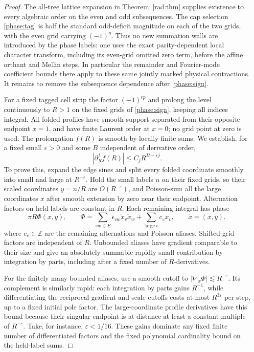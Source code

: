 \begin{proof}
The all-tree lattice expansion in Theorem~\ref{rad:thm} supplies existence to every algebraic order on the even and odd subsequences. The cap selection \eqref{phase:tag} is half the standard odd-deficit magnitude on each of the two grids, with the even grid carrying \((-1)^q\). Thus no new summation walls are introduced by the phase labels: one uses the exact parity-dependent local character transform, including its even-grid omitted zero term, before the affine orthant and Mellin steps. In particular the remainder and Fourier-mode coefficient bounds there apply to these same jointly marked physical contractions. It remains to remove the subsequence dependence after \eqref{phase:sign}.

For a fixed tagged cell strip the factor \((-1)^{rp}\) and prolong the level continuously to \(R>1\) on the fixed grids of \eqref{phase:sign}, keeping all indices integral. All folded profiles have smooth support separated from their opposite endpoint \(x=1\), and have finite Laurent order at \(x=0\); no grid point at zero is used. The prolongation \(f(R)\) is smooth by locally finite sums. We establish, for a fixed small \(\varepsilon>0\) and some \(B\) independent of derivative order,
\begin{equation}
 |\partial_R^j f(R)|\le C_j R^{B-\varepsilon j}.
 \label{phase:symbol}
\end{equation}
To prove this, expand the edge sines and split every folded coordinate smoothly into small and large at \(R^{-\varepsilon}\). Hold the small labels \(n\) on their fixed grids, so their scaled coordinates \(y=n/R\) are \(O(R^{-\varepsilon})\), and Poisson-sum all the large coordinates \(x\) after smooth extension by zero near their endpoint. Alternation factors on held labels are constant in \(R\). Each remaining integral has phase
\[
 \pi R \Phi(x,y),\qquad
 \Phi=\sum_{vw\in E}\epsilon_{vw}\widetilde x_v\widetilde x_w
                         +\sum_{\mathrm{large}\ v}c_v x_v ,
 \qquad \widetilde x=(x,y),
\]
where \(c_v\in\mathbb Z\) are the remaining alternations and Poisson aliases. Shifted-grid factors are independent of \(R\). Unbounded aliases have gradient comparable to their size and give an absolutely summable rapidly small contribution by integration by parts, including after a fixed number of \(R\)-derivatives.

For the finitely many bounded aliases, use a smooth cutoff to \(\lvert\nabla_x\Phi\rvert\lesssim R^{-\varepsilon}\). Its complement is similarly rapid: each integration by parts gains \(R^{-1}\), while differentiating the reciprocal gradient and scale cutoffs costs at most \(R^{3\varepsilon}\) per step, up to a fixed initial pole factor. The large-coordinate profile derivatives have this bound because their singular endpoint is at distance at least a constant multiple of \(R^{-\varepsilon}\). Take, for instance, \(\varepsilon<1/16\). These gains dominate any fixed finite number of differentiated factors and the fixed polynomial cardinality bound on the held-label sums.


\end{proof}
